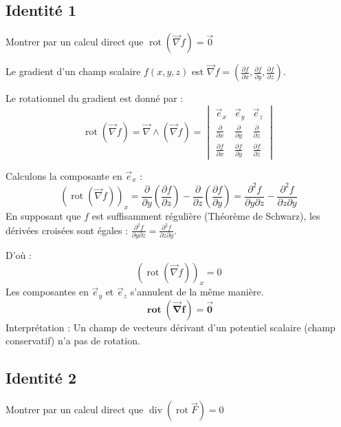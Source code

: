 \documentclass[french]{yLectureNote}
\renewcommand{\vec}{\overrightarrow}
\begin{document}
\subsection{Identité 1}
Montrer par un calcul direct que $\operatorname{rot}(\vec{\nabla}f)=\vec{0}$

Le gradient d'un champ scalaire $f(x,y,z)$ est $\vec{\nabla}f = \left(\frac{\partial f}{\partial x}, \frac{\partial f}{\partial y}, \frac{\partial f}{\partial z}\right)$.

Le rotationnel du gradient est donné par :
$$
\operatorname{rot}(\vec{\nabla}f) = \vec{\nabla} \wedge (\vec{\nabla}f) = \begin{vmatrix} \vec{e}_x & \vec{e}_y & \vec{e}_z \\ \frac{\partial}{\partial x} & \frac{\partial}{\partial y} & \frac{\partial}{\partial z} \\ \frac{\partial f}{\partial x} & \frac{\partial f}{\partial y} & \frac{\partial f}{\partial z} \end{vmatrix}
$$

Calculons la composante en $\vec{e}_x$ :
$$
(\operatorname{rot}(\vec{\nabla}f))_x = \frac{\partial}{\partial y}\left(\frac{\partial f}{\partial z}\right) - \frac{\partial}{\partial z}\left(\frac{\partial f}{\partial y}\right) = \frac{\partial^{2}f}{\partial y \partial z} - \frac{\partial^{2}f}{\partial z \partial y}
$$
En supposant que $f$ est suffisamment régulière (Théorème de Schwarz), les dérivées croisées sont égales : $\frac{\partial^{2}f}{\partial y \partial z} = \frac{\partial^{2}f}{\partial z \partial y}$.

D'où :
$$
(\operatorname{rot}(\vec{\nabla}f))_x = 0
$$
Les composantes en $\vec{e}_y$ et $\vec{e}_z$ s'annulent de la même manière.
$$
\mathbf{\operatorname{rot}(\vec{\nabla}f) = \vec{0}}
$$
Interprétation : Un champ de vecteurs dérivant d'un potentiel scalaire (champ conservatif) n'a pas de rotation.

\subsection{Identité 2}
Montrer par un calcul direct que $\operatorname{div}(\operatorname{rot}\vec{F})=0$
\end{document}

